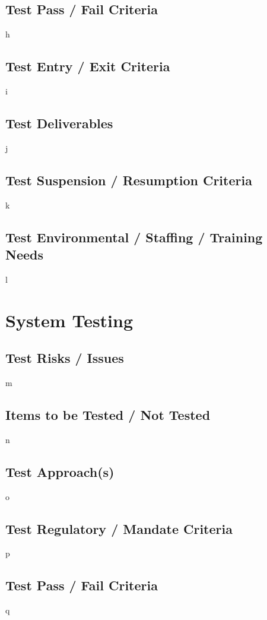 \documentclass{article}
\begin{document}
\subsection{Test Pass / Fail Criteria}
h

\subsection{Test Entry / Exit Criteria}
i

\subsection{Test Deliverables}
j

\subsection{Test Suspension / Resumption Criteria}
k

\subsection{Test Environmental / Staffing / Training Needs}
l

\section{System Testing}
\subsection{Test Risks / Issues}
m

\subsection{Items to be Tested / Not Tested}
n

\subsection{Test Approach(s)}
o

\subsection{Test Regulatory / Mandate Criteria}
p

\subsection{Test Pass / Fail Criteria}
q
\end{document}
